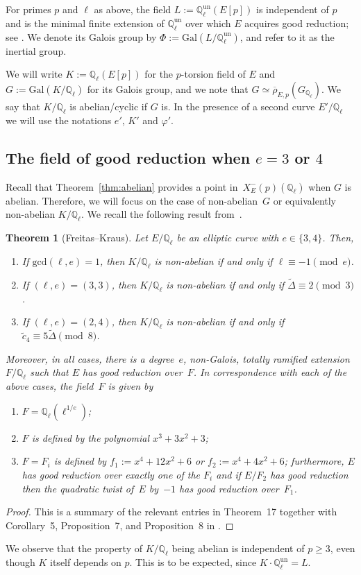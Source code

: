 \documentclass[12pt]{amsart}
\numberwithin{equation}{section}
\newtheorem{theorem}[equation]{Theorem}
\theoremstyle{definition}
\renewcommand{\gcd}{\text{gcd}}
\newcommand{\Q}{\mathbb{Q}}
\newcommand{\rhobar}{{\overline{\rho}}}
\newcommand{\Xp}{X_E^{-}(p)}
\newcommand{\Gal}{\text{Gal}}
\newcommand{\Qun}{\mathbb Q_\ell^{\text{un}}}
\begin{document}
For primes $p$ and $\ell$ as above, the field $L:=\Qun(E[p])$
is independent of $p$ and is the minimal finite extension of
$\Qun$ over which $E$ acquires good
reduction; see
\cite[Theorem~2(ii), and Corollary~2]{SerreTate}. We denote its Galois group by 
$\Phi := \Gal(L/\Qun)$, and refer to it as the inertial group.

We will write $K:=\Q_\ell(E[p])$ for the $p$-torsion field of $E$ and $G:=\Gal(K/\Q_\ell)$ for its Galois group, and we note that $G \simeq \rhobar_{E,p}(G_{\Q_\ell})$. We say that $K/\Q_\ell$ is abelian/cyclic if $G$ is.
In the presence of a second curve $E'/\Q_\ell$ we will use the notations $e'$, $K'$ and $\varphi'$.

\subsection{The field of good reduction when \texorpdfstring{$e=3$}{} or \texorpdfstring{$4$}{}}

Recall that Theorem~\ref{thm:abelian} provides a point in~$\Xp(\Q_\ell)$ when $G $ is abelian.
Therefore, we will focus on the case of non-abelian~$G$ or equivalently non-abelian $K/\Q_\ell$.
We recall the following result from~\cite{symplectic}.

\begin{theorem}[Freitas--Kraus]\label{thm:F}
Let $E/\Q_\ell$ be an elliptic curve with $e \in \{3,4\} $.
Then,
\begin{enumerate}
    \item If $\gcd(\ell,e)=1$, then $K/\Q_\ell$ is non-abelian if and only if $\ell \equiv -1 \pmod{e}$.
    \item If $(\ell,e)=(3,3)$, then $K/\Q_\ell$ is non-abelian if and only if $\tilde{\Delta} \equiv 2 \pmod 3$.
    \item If $(\ell,e)=(2,4)$, then $K/\Q_\ell$ is non-abelian if and only if $\tilde{c}_4\equiv 5\tilde{\Delta} \pmod{8}$.
\end{enumerate}

Moreover, in all cases,
there is a degree~$e$, non-Galois, totally ramified extension $F/\Q_\ell$ such that $E$ has good reduction over~$F$. In correspondence with each of the above cases, the  field~$F$ is given by
\begin{enumerate}
    \item $F=\Q_\ell(\ell^{1/e})$;
    \item $F$ is defined by the polynomial $x^3+3x^2+3$;
    \item $F = F_i$ is defined by $f_1:=x^4 + 12x^2 + 6$ or $f_2:= x^4 + 4x^2 + 6$;
    furthermore, $E$ has good reduction over exactly one of the $F_i$ and if $E/F_2$ has good reduction then the quadratic twist of~$E$ by~$-1$ has good reduction over~$F_1$.
\end{enumerate}
\end{theorem}
\begin{proof}
This is a summary of the relevant entries in Theorem~17 together with Corollary~5, Proposition~7, and Proposition~8 in \cite{symplectic}.
\end{proof}
We observe that the property of $K/\Q_\ell$ being abelian is independent of $p\geq 3$, even though $K$ itself depends on $p$. This is to be expected, since $K\cdot \Qun = L$.
\end{document}
